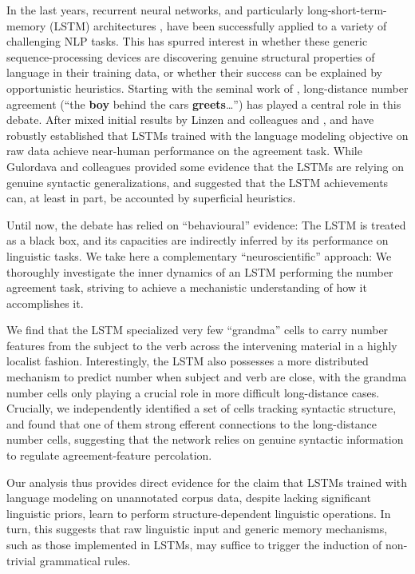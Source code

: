 In the last years, recurrent neural networks, and particularly
long-short-term-memory (LSTM) architectures
\cite{Hochreiter:Schmidhuber:1997}, have been successfully applied to
a variety of challenging NLP tasks. This has spurred interest in
whether these generic sequence-processing devices are discovering
genuine structural properties of language in their training data, or
whether their success can be explained by opportunistic
heuristics. Starting with the seminal work of , long-distance number agreement (``the
\textbf{boy} behind the cars \textbf{greets}\ldots'') has played a
central role in this debate. After mixed initial results by Linzen and
colleagues and ,
 and  have
robustly established that LSTMs trained with the language modeling
objective on raw data achieve near-human performance on the
agreement task. While Gulordava and colleagues provided some evidence that the
LSTMs are relying on genuine syntactic generalizations,
 and 
suggested that the LSTM achievements can, at least in part, be
accounted by superficial heuristics.

Until now, the debate has relied on ``behavioural'' evidence: The
LSTM is treated as a black box, and its capacities are indirectly
inferred by its performance on linguistic tasks. We take here a
complementary ``neuroscientific'' approach: We thoroughly investigate
the inner dynamics of an LSTM performing the number agreement task,
striving to achieve a mechanistic understanding of how it accomplishes
it.

We find that the LSTM specialized very few ``grandma'' cells
\cite{Bowers:2009} to carry number features from the subject to the
verb across the intervening material in a highly localist
fashion. Interestingly, the LSTM also possesses a more distributed
mechanism to predict number when subject and verb are close, with the
grandma number cells only playing a crucial role in more difficult
long-distance cases. Crucially, we independently identified a set of
cells tracking syntactic structure, and found that one of them  strong efferent connections to the long-distance number cells,
suggesting that the network relies on genuine syntactic information to
regulate agreement-feature percolation.

Our analysis thus provides direct evidence for the claim that LSTMs
trained with language modeling on unannotated corpus data, despite
lacking significant linguistic priors, learn to perform
structure-dependent linguistic operations. In turn, this suggests that
raw linguistic input and generic memory mechanisms, such as those
implemented in LSTMs, may suffice to trigger the induction of
non-trivial grammatical rules.

